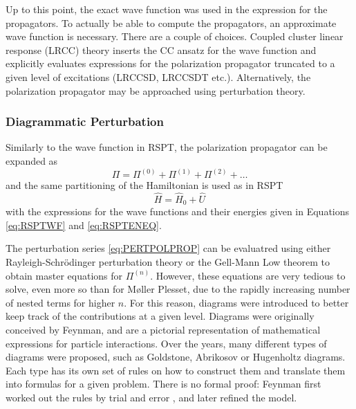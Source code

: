 Up to this point, the exact wave function was used in the expression for the propagators. To actually be able to compute the propagators, an approximate wave function is necessary. There are a couple of choices. Coupled cluster linear response (LRCC) theory inserts the CC ansatz for the wave function and explicitly evaluates expressions for the polarization propagator truncated to a given level of excitations (LRCCSD, LRCCSDT etc.). Alternatively, the polarization propagator may be approached using perturbation theory.

\subsubsection{Diagrammatic Perturbation}

Similarly to the wave function in RSPT, the polarization propagator can be expanded as
\begin{equation}
\Pi = \Pi^{(0)} + \Pi^{(1)} + \Pi^{(2)} + \ldots
\label{eq:PERTPOLPROP}
\end{equation}
\noindent and the same partitioning of the Hamiltonian is used as in RSPT
\begin{equation}
\hat{H} = \hat{H}_0 + \hat{U}
\end{equation}
\noindent with the expressions for the wave functions and their energies given in Equations \ref{eq:RSPTWF} and \ref{eq:RSPTENEQ}. 

The perturbation series \ref{eq:PERTPOLPROP} can be evaluatred using either Rayleigh-Schrödinger perturbation theory or the Gell-Mann Low theorem \cite{Sch2018} to obtain master equations for $\Pi^{(n)}$. However, these equations are very tedious to solve, even more so than for M{\o}ller Plesset, due to the rapidly increasing number of nested terms for higher $n$. For this reason, diagrams were introduced to better keep track of the contributions at a given level. Diagrams were originally conceived by Feynman, and are a pictorial representation of mathematical expressions for particle interactions. Over the years, many different types of diagrams were proposed, such as Goldstone, Abrikosov or Hugenholtz diagrams. Each type has its own set of rules on how to construct them and translate them into formulas for a given problem. There is no formal proof: Feynman first worked out the rules by trial and error \cite{Fey1966}, and later refined the model.


